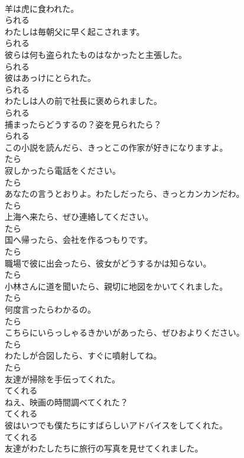 \documentclass[8pt]{extreport}
\begin{document}
\begin{CJK}{UTF8}{min}
\\	羊は虎に食われた。	
\\	られる
\\	わたしは毎朝父に早く起こされます。	
\\	られる
\\	彼らは何も盗られたものはなかったと主張した。	
\\	られる
\\	彼はあっけにとられた。	
\\	られる
\\	わたしは人の前で社長に褒められました。	
\\	られる
\\	捕まったらどうするの？姿を見られたら？	
\\	られる
\\	この小説を読んだら、きっとこの作家が好きになりますよ。	
\\	たら
\\	寂しかったら電話をください。	
\\	たら
\\	あなたの言うとおりよ。わたしだったら、きっとカンカンだわ。	
\\	たら
\\	上海へ来たら、ぜひ連絡してください。	
\\	たら
\\	国へ帰ったら、会社を作るつもりです。	
\\	たら
\\	職場で彼に出会ったら、彼女がどうするかは知らない。	
\\	たら
\\	小林さんに道を聞いたら、親切に地図をかいてくれました。	
\\	たら
\\	何度言ったらわかるの。	
\\	たら
\\	こちらにいらっしゃるきかいがあったら、ぜひおよりください。	
\\	たら
\\	わたしが合図したら、すぐに噴射してね。	
\\	たら
\\	友達が掃除を手伝ってくれた。	
\\	てくれる
\\	ねえ、映画の時間調べてくれた？	
\\	てくれる
\\	彼はいつでも僕たちにすばらしいアドバイスをしてくれた。	
\\	てくれる
\\	友達がわたしたちに旅行の写真を見せてくれました。	

\end{CJK}
\end{document}
